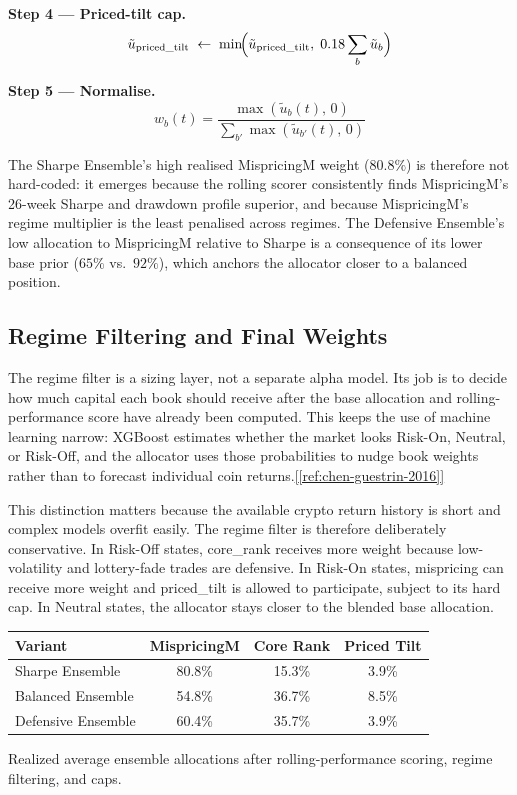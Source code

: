 \documentclass[11pt,a4paper]{article}
\newcommand{\ieeecite}[1]{\hyperref[ref:#1]{[\ref*{ref:#1}]}}
\begin{document}
\textbf{Step 4 — Priced-tilt cap.}
\begin{equation*}
  \tilde{u}_{\text{priced\_tilt}} \;\leftarrow\; \min\!\Bigl(\tilde{u}_{\text{priced\_tilt}},\;0.18\sum_b \tilde{u}_b\Bigr)
\end{equation*}

\textbf{Step 5 — Normalise.}
\begin{equation*}
  w_b(t) = \frac{\max(\tilde{u}_b(t),\,0)}{\displaystyle\sum_{b'} \max(\tilde{u}_{b'}(t),\,0)}
\end{equation*}

The Sharpe Ensemble's high realised MispricingM weight ($80.8\%$) is therefore not hard-coded: it emerges because the rolling scorer consistently finds MispricingM's 26-week Sharpe and drawdown profile superior, and because MispricingM's regime multiplier is the least penalised across regimes. The Defensive Ensemble's low allocation to MispricingM relative to Sharpe is a consequence of its lower base prior ($65\%$ vs.\ $92\%$), which anchors the allocator closer to a balanced position.

\subsection{Regime Filtering and Final Weights}

The regime filter is a sizing layer, not a separate alpha model. Its job is to decide how much capital each book should receive after the base allocation and rolling-performance score have already been computed. This keeps the use of machine learning narrow: XGBoost estimates whether the market looks Risk-On, Neutral, or Risk-Off, and the allocator uses those probabilities to nudge book weights rather than to forecast individual coin returns.\ieeecite{chen-guestrin-2016}

This distinction matters because the available crypto return history is short and complex models overfit easily. The regime filter is therefore deliberately conservative. In Risk-Off states, core\_rank receives more weight because low-volatility and lottery-fade trades are defensive. In Risk-On states, mispricing can receive more weight and priced\_tilt is allowed to participate, subject to its hard cap. In Neutral states, the allocator stays closer to the blended base allocation.

\begin{center}
\small
\begin{tabular}{lccc}
\toprule
\rowcolor{tablehead}
\textbf{Variant} & \textbf{MispricingM} & \textbf{Core Rank} & \textbf{Priced Tilt} \\
\midrule
Sharpe Ensemble    & 80.8\% & 15.3\% & 3.9\% \\
Balanced Ensemble  & 54.8\% & 36.7\% & 8.5\% \\
Defensive Ensemble & 60.4\% & 35.7\% & 3.9\% \\
\bottomrule
\end{tabular}
\end{center}
\smallskip
{\small Realized average ensemble allocations after rolling-performance scoring, regime filtering, and caps.}
\end{document}
